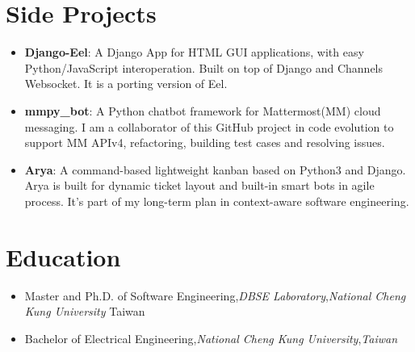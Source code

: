 \documentclass[a4paper,11pt]{article}
\newcommand{\resumeItem}[2]{
  \item{
    \textbf{\small#1}{: \small#2 \vspace{-2pt}}
  }
}
\newcommand{\resumeEducationItem}[3]{
  \vspace{-1pt}\item
    {#1}{,}\hspace{4pt}\textit{#2}{,}\hspace{4pt}\textit{#3}\vspace{-6pt}
}
\newcommand{\resumeSubItem}[2]{\resumeItem{#1}{#2}\vspace{-4pt}}
\newcommand{\resumeSubHeadingListStart}{\begin{itemize}[leftmargin=*]}
\newcommand{\resumeSubHeadingListEnd}{\end{itemize}}
\newcommand\smalldiv{\smash{\raisebox{0.29ex}{\scalebox{0.8}{/}}}}
\begin{document}
\begin{CJK}{UTF8}{bkai}
\section{Side Projects}
  \resumeSubHeadingListStart
    \resumeSubItem{Django-Eel}
      {A Django App for HTML GUI applications, with easy Python/JavaScript interoperation. Built on top of Django and Channels Websocket. It is a porting version of Eel.}
    \resumeSubItem{mmpy\_bot}
      {A Python chatbot framework for Mattermost(MM) cloud messaging. I am a collaborator of this GitHub project in code evolution to support MM APIv4, refactoring, building test cases and resolving issues.}
    \resumeSubItem{Arya}
      {A command-based lightweight kanban based on Python3 and Django. Arya is built for dynamic ticket layout and built-in smart bots in agile process. It's part of my long-term plan in context-aware software engineering.}
  \resumeSubHeadingListEnd


\section{Education}
  \resumeSubHeadingListStart
    \resumeEducationItem
      {Master and Ph.D. of Software Engineering}{DBSE Laboratory}{National Cheng Kung University}{Taiwan}
    \resumeEducationItem
      {Bachelor of Electrical Engineering}{National Cheng Kung University}{Taiwan}
  \resumeSubHeadingListEnd

%


\end{CJK}
\end{document}
